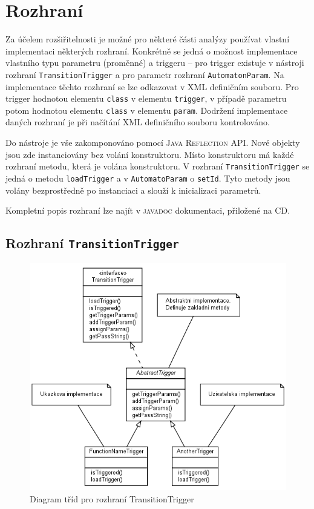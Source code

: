 \documentclass[11pt,final,oneside]{fithesis}
\begin{document}

\section{Rozhraní}\label{toc-interface}
Za účelem rozšiřitelnosti je možné pro některé části analýzy používat vlastní implementaci některých rozhraní. 
Konkrétně se jedná o možnost implementace vlastního typu parametru (proměnné) a triggeru -- pro trigger existuje v nástroji rozhraní {\tt TransitionTrigger} a pro parametr rozhraní {\tt AutomatonParam}. Na implementace těchto rozhraní se lze odkazovat v XML definičním souboru. Pro trigger hodnotou elementu {\tt class} v elementu {\tt trigger}, v případě parametru potom hodnotou elementu {\tt class} v elementu {\tt param}. Dodržení implementace daných rozhraní je při načítání XML definičního souboru kontrolováno.

Do nástroje je vše zakomponováno pomocí \textsc{Java Reflection API}. Nové objekty jsou zde instanciovány bez volání konstruktoru. Místo konstruktoru má každé rozhraní metodu, která je volána  konstruktoru. V rozhraní \texttt{TransitionTrigger} se jedná o metodu \texttt{loadTrigger} a v \texttt{AutomatoParam} o \texttt{setId}. Tyto metody jsou volány bezprostředně po instanciaci a slouží k inicializaci parametrů.

Kompletní popis rozhraní lze najít v \textsc{javadoc} dokumentaci, přiložené na CD.


\subsection[TransitionTrigger]{Rozhraní \texttt{TransitionTrigger}}\label{interface-trigger}

\begin{figure}[ht]
\begin{center}
\ifpdf
	\includegraphics[width=12cm]{img/trigger.png}
\fi
\end{center}
\caption{Diagram tříd pro rozhraní TransitionTrigger}
\label{transition-trigger-classdiagram}
\end{figure}
\end{document}
